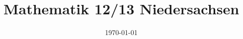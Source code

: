 \documentclass{article}
\begin{document}
\addtocounter{page}{-3}

\title{Mathematik 12/13 Niedersachsen}
\date{\today}
\author{}
\maketitle

\thispagestyle{empty}

\clearpage

\pagestyle{empty}

\tableofcontents

\clearpage

\pagestyle{plain}





\end{document}

